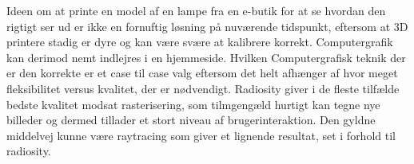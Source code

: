 Ideen om at printe en model af en lampe fra en e-butik for at se hvordan den rigtigt ser ud er ikke en fornuftig løsning på nuværende tidspunkt, eftersom at 3D printere stadig er dyre og kan være svære at kalibrere korrekt. Computergrafik kan derimod nemt indlejres i en hjemmeside. Hvilken Computergrafisk teknik der er den korrekte er et case til case valg eftersom det helt afhænger af hvor meget fleksibilitet versus kvalitet, der er nødvendigt. Radiosity giver i de fleste tilfælde bedste kvalitet modsat rasterisering, som tilmgengæld hurtigt kan tegne nye billeder og dermed tillader et stort niveau af brugerinteraktion. Den gyldne middelvej kunne være raytracing som giver et lignende resultat, set i forhold til radiosity.